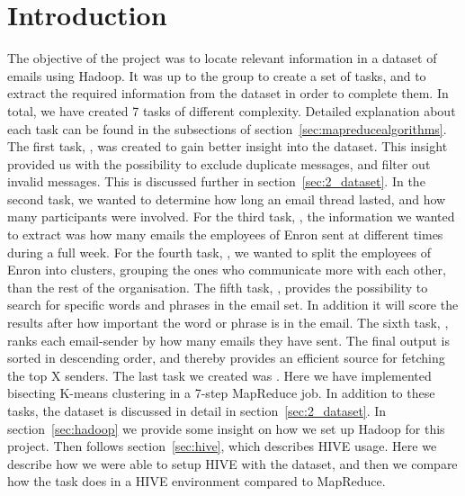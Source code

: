 \documentclass[runningheads,a4paper]{llncs}
\begin{document}
\section{Introduction}
The objective of the project was to locate relevant information in a dataset of emails using Hadoop. It was up to the group to create a set of tasks, and to extract the required information from the dataset in order to complete them.
\newline
\newline
In total, we have created 7 tasks of different complexity. Detailed explanation about each task can be found in the subsections of section~\ref{sec:mapreducealgorithms}.
\newline
The first task, \texttt{}, was created to gain better insight into the dataset. This insight provided us with the possibility to exclude duplicate messages, and filter out invalid messages. This is discussed further in section~\ref{sec:2_dataset}.
\newline
In the second task, \texttt{} we wanted to determine how long an email thread lasted, and how many participants were involved. For the third task, \texttt{}, the information we wanted to extract was how many emails the employees of Enron sent at different times during a full week.
\newline
For the fourth task, \texttt{}, we wanted to split the employees of Enron into clusters, grouping the ones who communicate more with each other, than the rest of the organisation.
\newline
The fifth task, \texttt{}, provides the possibility to search for specific words and phrases in the email set. In addition it will score the results after how important the word or phrase is in the email. The sixth task, \texttt{}, ranks each email-sender by how many emails they have sent. The final output is sorted in descending order, and thereby provides an efficient source for fetching the top X senders.
\newline
The last task we created was \texttt{}. Here we have implemented bisecting K-means clustering in a 7-step MapReduce job.
\newline
\newline
In addition to these tasks, the dataset is discussed in detail in section~\ref{sec:2_dataset}. In section~\ref{sec:hadoop} we provide some insight on how we set up Hadoop for this project. Then follows section~\ref{sec:hive}, which describes HIVE usage. Here we describe how we were able to setup HIVE with the dataset, and then we compare how the task \texttt{} does in a HIVE environment compared to MapReduce.
\end{document}
